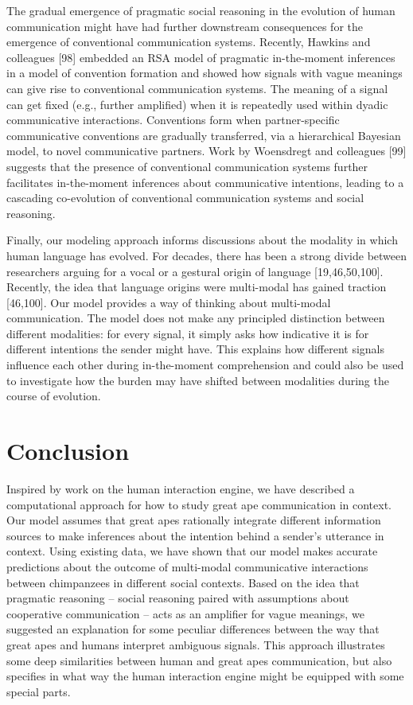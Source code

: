 \documentclass[
  man,floatsintext]{apa6}
\begin{document}
The gradual emergence of pragmatic social reasoning in the evolution of human communication might have had further downstream consequences for the emergence of conventional communication systems. Recently, Hawkins and colleagues {[}98{]} embedded an RSA model of pragmatic in-the-moment inferences in a model of convention formation and showed how signals with vague meanings can give rise to conventional communication systems. The meaning of a signal can get fixed (e.g., further amplified) when it is repeatedly used within dyadic communicative interactions. Conventions form when partner-specific communicative conventions are gradually transferred, via a hierarchical Bayesian model, to novel communicative partners. Work by Woensdregt and colleagues {[}99{]} suggests that the presence of conventional communication systems further facilitates in-the-moment inferences about communicative intentions, leading to a cascading co-evolution of conventional communication systems and social reasoning.

Finally, our modeling approach informs discussions about the modality in which human language has evolved. For decades, there has been a strong divide between researchers arguing for a vocal or a gestural origin of language {[}19,46,50,100{]}. Recently, the idea that language origins were multi-modal has gained traction {[}46,100{]}. Our model provides a way of thinking about multi-modal communication. The model does not make any principled distinction between different modalities: for every signal, it simply asks how indicative it is for different intentions the sender might have. This explains how different signals influence each other during in-the-moment comprehension and could also be used to investigate how the burden may have shifted between modalities during the course of evolution.

\hypertarget{conclusion}{%
\section{Conclusion}\label{conclusion}}

Inspired by work on the human interaction engine, we have described a computational approach for how to study great ape communication in context. Our model assumes that great apes rationally integrate different information sources to make inferences about the intention behind a sender's utterance in context. Using existing data, we have shown that our model makes accurate predictions about the outcome of multi-modal communicative interactions between chimpanzees in different social contexts. Based on the idea that pragmatic reasoning -- social reasoning paired with assumptions about cooperative communication -- acts as an amplifier for vague meanings, we suggested an explanation for some peculiar differences between the way that great apes and humans interpret ambiguous signals. This approach illustrates some deep similarities between human and great apes communication, but also specifies in what way the human interaction engine might be equipped with some special parts.
\end{document}
